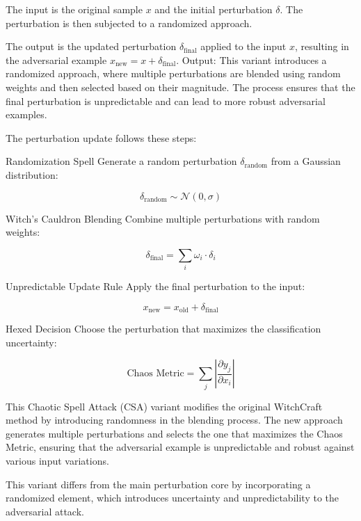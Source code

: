The input is the original sample \(x\) and the initial perturbation \(\delta\). The perturbation is then subjected to a randomized approach.

The output is the updated perturbation \(\delta_{\text{final}}\) applied to the input \(x\), resulting in the adversarial example \(x_{\text{new}} = x + \delta_{\text{final}}\).
Output: This variant introduces a randomized approach, where multiple perturbations are blended using random weights and then selected based on their magnitude. The process ensures that the final perturbation is unpredictable and can lead to more robust adversarial examples.

The perturbation update follows these steps:

Randomization Spell Generate a random perturbation \(\delta_{\text{random}}\) from a Gaussian distribution:

\[
\delta_{\text{random}} \sim \mathcal{N}(0, \sigma)
\]

Witch’s Cauldron Blending Combine multiple perturbations with random weights:

\[
\delta_{\text{final}} = \sum_{i} \omega_i \cdot \delta_i
\]

Unpredictable Update Rule Apply the final perturbation to the input:

\[
x_{\text{new}} = x_{\text{old}} + \delta_{\text{final}}
\]

Hexed Decision Choose the perturbation that maximizes the classification uncertainty:

\[
\text{Chaos Metric} = \sum_j \left| \frac{\partial y_j}{\partial x_i} \right|
\]

This Chaotic Spell Attack (CSA) variant modifies the original WitchCraft method by introducing randomness in the blending process. The new approach generates multiple perturbations and selects the one that maximizes the Chaos Metric, ensuring that the adversarial example is unpredictable and robust against various input variations.

This variant differs from the main perturbation core by incorporating a randomized element, which introduces uncertainty and unpredictability to the adversarial attack.